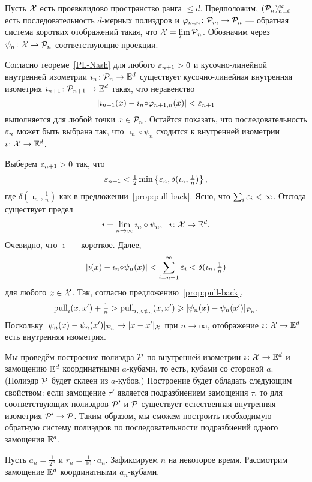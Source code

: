 \documentclass[oneside,a4paper]{article}
\begin{document}
Пусть $\mathcal{X}$ есть проевклидово пространство ранга $\le d$.
Предположим, $(\mathcal{P}_n)_{n=0}^\infty$ есть последовательность $d$-мерных полиэдров и  
$\varphi_{m,n}\colon \mathcal{P}_m\to \mathcal{P}_n$
--- обратная система коротких отображений такая, что $\mathcal{X}=\varprojlim \mathcal{P}_n$.
Обозначим через $\psi_n\colon\mathcal{X}\to \mathcal{P}_n$ соответствующие проекции.

Согласно теореме~\ref{PL-Nash}
для любого $\varepsilon_{n+1}>0$ и кусочно-линейной внутренней изометрии $\imath_n\:\spc{P}_n\z\to \EE^d$
существует кусочно-линейная внутренняя изометрия 
$\imath_{n+1}\:\spc{P}_{n+1}\z\to \EE^d$ такая, что неравенство
$$|\imath_{n+1}(x)- \imath_{n}{\circ}\varphi_{n+1,n}(x)|<\varepsilon_{n+1}$$
выполняется для любой точки $x\in \mathcal{P}_n$.
Остаётся показать, что последовательность $\varepsilon_{n}$ может быть выбрана так, 
что $\imath_n{\circ}\psi_n$ сходится к внутренней изометрии $\imath\:\spc{X}\z\to\EE^d$.

Выберем  
$\varepsilon_{n+1}>0$ так, что 
$$\varepsilon_{n+1}<\tfrac12\min\left\{\varepsilon_n,\delta(\imath_n,\tfrac1n)\right\},$$
где $\delta(\imath_n,\tfrac1n)$ как в предложении~\ref{prop:pull-back}.
Ясно, что $\sum_i\varepsilon_i<\infty$. 
Отсюда существует предел
$$\imath=\lim_{n\to\infty} \imath_n\circ\psi_n,\ \ \imath\colon\mathcal{X}\to\mathbb{E}^d.$$
Очевидно, что $\imath$ --- короткое.
Далее,
$$|\imath(x)- \imath_n{\circ}\psi_n(x)|< \sum_{i=n+1}^\infty\varepsilon_i<\delta(\imath_n,\tfrac1n)$$ 
для любого $x\in \mathcal{X}$.
Так, согласно предложению~\ref{prop:pull-back},
$$\mathop{\rm pull}\nolimits_{\imath}(x,x')+\tfrac1n
>
\mathop{\rm pull}\nolimits_{\imath_n\circ\psi_n}(x,x')
\geqslant
|\psi_n(x)-\psi_n(x')|_{\mathcal{P}_n}.$$
Поскольку $|\psi_n(x)-\psi_n(x')|_{\mathcal{P}_n}\to |x-x'|_{\mathcal{X}}$ при $n\to\infty$, отображение $\imath\colon\mathcal{X}\to\mathbb{E}^d$ есть внутренняя изометрия.\qeds


Мы проведём построение полиэдра $\mathcal{P}$ 
по внутренней изометрии $\imath\colon \mathcal{X}\to \mathbb{E}^d$ и замощению $\mathbb{E}^d$ координатными $a$-кубами,
то есть, кубами со стороной $a$.
(Полиэдр $\mathcal{P}$ будет склеен из $a$-кубов.)
Построение будет обладать следующим свойством:
если замощение $\tau'$ является подразбиением замощения $\tau$, то для соответствующих полиэдров $\mathcal{P}'$ и $\mathcal{P}$ существует естественная внутренняя изометрия $\mathcal{P}'\to \mathcal{P}$. 
Таким образом, мы сможем построить необходимую обратную систему полиэдров по последовательности подразбиений одного замощения $\mathbb{E}^d$.

Пусть $a_n=\tfrac{1}{2^{n}}$ и $r_n=\tfrac{1}{10}\cdot a_n$.
Зафиксируем $n$ на некоторое время.
Рассмотрим замощение $\mathbb{E}^d$ координатными $a_n$-кубами.
\end{document}
